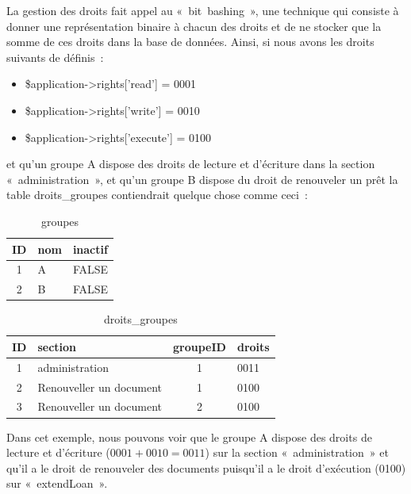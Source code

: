 \documentclass[letter, 11pt, draft]{report}
\begin{document}
La gestion des droits fait appel au «~bit~bashing~», une technique qui consiste à donner une représentation binaire à chacun des droits et de ne stocker que la somme de ces droits dans la base de données. Ainsi, si nous avons les droits suivants de définis~:

\begin{itemize}
	\item \$application->rights['read'] = 0001
	\item \$application->rights['write'] = 0010
	\item \$application->rights['execute'] = 0100
\end{itemize}

et qu'un groupe A dispose des droits de lecture et d'écriture dans la section «~administration~», et qu'un groupe B dispose du droit de renouveler un prêt la table droits\_groupes contiendrait quelque chose comme ceci~:

\begin{table}[ht]
	\caption{groupes}
	\begin{center}
		\begin{tabular}{|c|l|l|}
			\hline
			ID & nom & inactif \\
			\hline
			1  & A   & FALSE \\
			2  & B   & FALSE \\
			\hline
		\end{tabular}
	\end{center}
\end{table}

\begin{table}[h!]
	\caption{droits\_groupes}
	\begin{center}
		\begin{tabular}{|c|l|c|l|}
			\hline
			ID & section                 & groupeID & droits \\
			\hline
			1  & administration          & 1        & 0011 \\
			2  & Renouveller un document & 1        & 0100 \\
			3  & Renouveller un document & 2        & 0100 \\
			\hline
		\end{tabular}
	\end{center}
\end{table}

Dans cet exemple, nous pouvons voir que le groupe A dispose des droits de lecture et d'écriture ($ 0001 + 0010 = 0011 $) sur la section «~administration~» et qu'il a le droit de renouveler des documents puisqu'il a le droit d'exécution (0100) sur «~extendLoan~».
\end{document}
